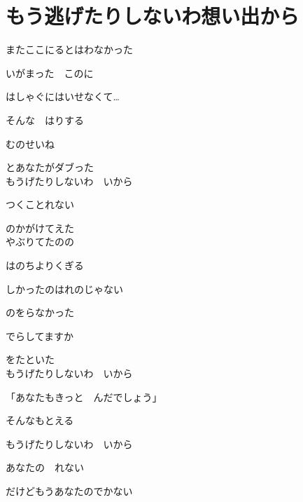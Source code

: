 \section{ もう逃げたりしないわ想い出から}
\large{

またここにるとはわなかった

いがまった　このに

はしゃぐにはいせなくて…

そんな　はりする

むのせいね　

とあなたがダブった
\\

もうげたりしないわ　いから

つくことれない

のかがけてえた
\\

やぶりてたのの

はのちよりくぎる

しかったのはれのじゃない

のをらなかった

でらしてますか

をたといた
\\

もうげたりしないわ　いから

「あなたもきっと　んだでしょう」

そんなもとえる

もうげたりしないわ　いから

あなたの　れない

だけどもうあなたのでかない

}